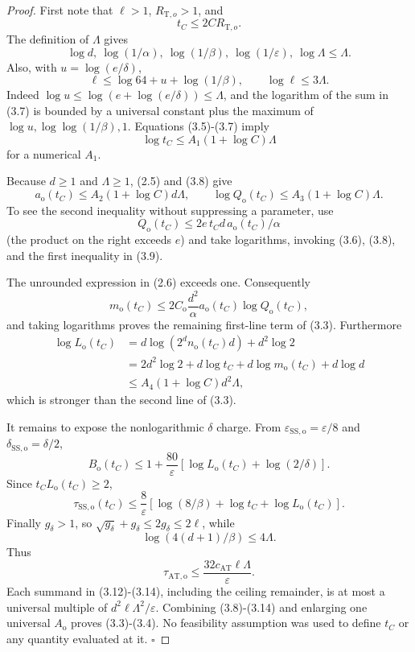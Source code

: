 \begin{proof}
First note that \(\ell>1\), \(R_{\mathrm T,o}>1\), and
\[
t_C\le2CR_{\mathrm T,o}.
\tag{3.5}
\]
The definition of \(\Lambda\) gives
\[
\log d,\ \log(1/\alpha),\ \log(1/\beta),\
\log(1/\varepsilon),\ \log\Lambda\le\Lambda.
\tag{3.6}
\]
Also, with \(u=\log(e/\delta)\),
\[
\ell\le \log64+u+\log(1/\beta),\qquad
\log\ell\le 3\Lambda.
\tag{3.7}
\]
Indeed \(\log u\le\log(e+\log(e/\delta))\le\Lambda\), and the logarithm
of the sum in (3.7) is bounded by a universal constant plus the maximum of
\(\log u,\log\log(1/\beta),1\).
Equations (3.5)-(3.7) imply
\[
\log t_C\le A_1(1+\log C)\Lambda
\tag{3.8}
\]
for a numerical \(A_1\).

Because \(d\ge1\) and \(\Lambda\ge1\), (2.5) and (3.8) give
\[
a_{\mathrm o}(t_C)
\le A_2(1+\log C)d\Lambda,
\qquad
\log Q_{\mathrm o}(t_C)
\le A_3(1+\log C)\Lambda.
\tag{3.9}
\]
To see the second inequality without suppressing a parameter, use
\[
Q_{\mathrm o}(t_C)
\le2e\,t_Cd\,a_{\mathrm o}(t_C)/\alpha
\]
(the product on the right exceeds \(e\)) and take logarithms, invoking
(3.6), (3.8), and the first inequality in (3.9).

The unrounded expression in (2.6) exceeds one. Consequently
\[
m_{\mathrm o}(t_C)
\le2C_{\mathrm o}\frac{d^2}{\alpha}
a_{\mathrm o}(t_C)\log Q_{\mathrm o}(t_C),
\tag{3.10}
\]
and taking logarithms proves the remaining first-line term of (3.3).
Furthermore
\[
\begin{aligned}
\log L_{\mathrm o}(t_C)
&=d\log(2^dn_{\mathrm o}(t_C)d)+d^2\log2\\
&=2d^2\log2+d\log t_C+d\log m_{\mathrm o}(t_C)+d\log d\\
&\le A_4(1+\log C)d^2\Lambda,
\end{aligned}
\tag{3.11}
\]
which is stronger than the second line of (3.3).

It remains to expose the nonlogarithmic \(\delta\) charge. From
\(\varepsilon_{\mathrm{SS,o}}=\varepsilon/8\) and
\(\delta_{\mathrm{SS,o}}=\delta/2\),
\[
B_{\mathrm o}(t_C)
\le1+\frac{80}{\varepsilon}
[\log L_{\mathrm o}(t_C)+\log(2/\delta)].
\tag{3.12}
\]
Since \(t_CL_{\mathrm o}(t_C)\ge2\),
\[
\tau_{\mathrm{SS,o}}(t_C)
\le\frac8\varepsilon
[\log(8/\beta)+\log t_C+\log L_{\mathrm o}(t_C)].
\tag{3.13}
\]
Finally \(g_\delta>1\), so
\(\sqrt{g_\delta}+g_\delta\le2g_\delta\le2\ell\), while
\[
\log(4(d+1)/\beta)\le4\Lambda.
\]
Thus
\[
\tau_{\mathrm{AT,o}}
\le\frac{32c_{\mathrm{AT}}\ell\Lambda}{\varepsilon}.
\tag{3.14}
\]
Each summand in (3.12)-(3.14), including the ceiling remainder, is at
most a universal multiple of
\(d^2\ell\Lambda^2/\varepsilon\). Combining (3.8)-(3.14) and enlarging
one universal \(A_{\mathrm o}\) proves (3.3)-(3.4). No feasibility
assumption was used to define \(t_C\) or any quantity evaluated at it.
\(\square\)


\end{proof}

